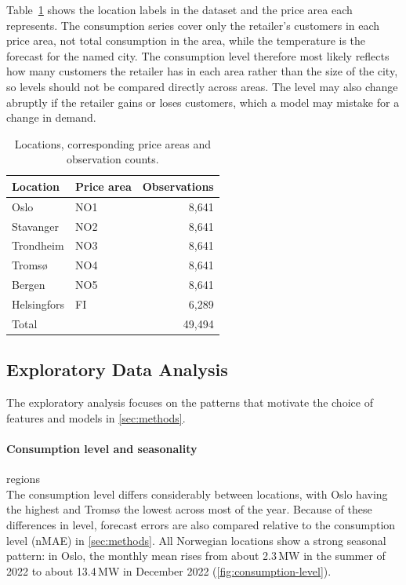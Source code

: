 \documentclass[11pt,a4paper]{article}
\begin{document}
Table~\ref{tab:dataset_locations} shows the location labels in the dataset and the price area each represents. The consumption series cover only the retailer's customers in each price area, not total consumption in the area, while the temperature is the forecast for the named city. The consumption level therefore most likely reflects how many customers the retailer has in each area rather than the size of the city, so levels should not be compared directly across areas. The level may also change abruptly if the retailer gains or loses customers, which a model may mistake for a change in demand.

\begin{table}[htbp]
    \centering
        \caption{Locations, corresponding price areas and observation counts.}
    \label{tab:dataset_locations}
    \begin{tabular}{llr}
        \hline
        Location & Price area & Observations \\
        \hline
        Oslo       & NO1 & 8,641 \\
        Stavanger  & NO2 & 8,641 \\
        Trondheim  & NO3 & 8,641 \\
        Troms{\o}  & NO4 & 8,641 \\
        Bergen     & NO5 & 8,641 \\
        Helsingfors & FI & 6,289 \\
        \hline
        Total & & 49,494 \\
        \hline
    \end{tabular}

\end{table}
\subsection{Exploratory Data Analysis}
\label{sec:eda}

The exploratory analysis focuses on the patterns that motivate the choice of features and models in \cref{sec:methods}.

\paragraph{Consumption level and seasonality} regions\mbox{}\\
The consumption level differs considerably between locations, with Oslo having the highest and Tromsø the lowest across most of the year. Because of these differences in level, forecast errors are also compared relative to the consumption level (nMAE) in \cref{sec:methods}. All Norwegian locations show a strong seasonal pattern: in Oslo, the monthly mean rises from about 2.3\,MW in the summer of 2022 to about 13.4\,MW in December 2022 (\cref{fig:consumption-level}).
\end{document}
